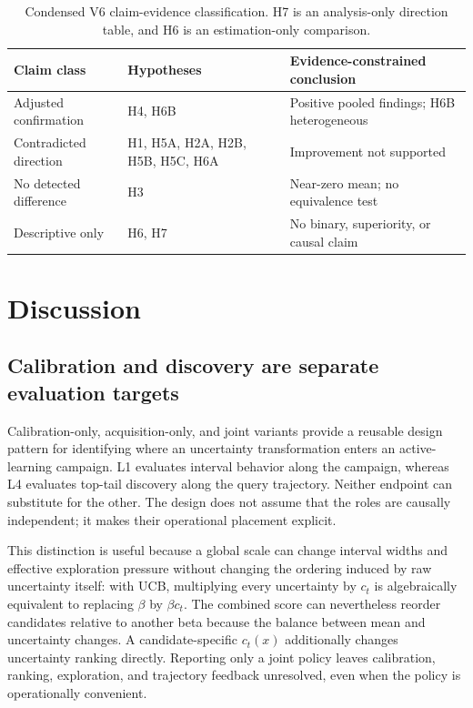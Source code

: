 \documentclass[10pt]{article}
\begin{document}
\begin{table}[!tbp]
\centering
\caption{Condensed V6 claim-evidence classification. H7 is an analysis-only
direction table, and H6 is an estimation-only comparison.}
\label{tab:claim-classification}
\small
\begin{tabular}{lll}
\toprule
Claim class & Hypotheses & Evidence-constrained conclusion\\
\midrule
Adjusted confirmation & H4, H6B & Positive pooled findings; H6B heterogeneous\\
Contradicted direction & H1, H5A, H2A, H2B, H5B, H5C, H6A & Improvement not supported\\
No detected difference & H3 & Near-zero mean; no equivalence test\\
Descriptive only & H6, H7 & No binary, superiority, or causal claim\\
\bottomrule
\end{tabular}
\end{table}
\FloatBarrier

\section{Discussion}
\subsection{Calibration and discovery are separate evaluation targets}
Calibration-only, acquisition-only, and joint variants provide a reusable
design pattern for identifying where an uncertainty transformation enters an
active-learning campaign. L1 evaluates interval behavior along the campaign,
whereas L4 evaluates top-tail discovery along the query trajectory. Neither
endpoint can substitute for the other. The design does not assume that the
roles are causally independent; it makes their operational placement explicit.

This distinction is useful because a global scale can change interval widths
and effective exploration pressure without changing the ordering induced by
raw uncertainty itself: with UCB, multiplying every uncertainty by $c_t$ is
algebraically equivalent to replacing $\beta$ by $\beta c_t$. The combined
score can nevertheless reorder candidates relative to another beta because
the balance between mean and uncertainty changes. A candidate-specific
$c_t(x)$ additionally changes uncertainty ranking directly. Reporting only a
joint policy leaves calibration, ranking, exploration, and trajectory feedback
unresolved, even when the policy is operationally convenient.
\end{document}

